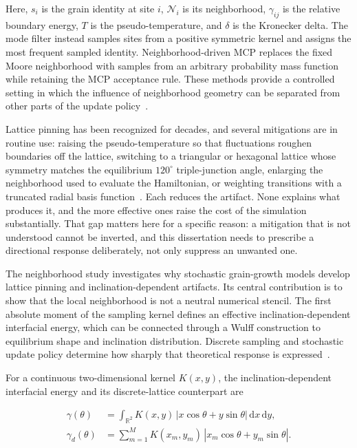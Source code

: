 \documentclass[proposalMode]{ufdissertation}
\begin{document}
Here, \(s_i\) is the grain identity at site \(i\), \(\mathcal{N}_i\) is its neighborhood, \(\gamma_{ij}\) is the relative boundary energy, \(T\) is the pseudo-temperature, and \(\delta\) is the Kronecker delta. The mode filter instead samples sites from a positive symmetric kernel and assigns the most frequent sampled identity. Neighborhood-driven MCP replaces the fixed Moore neighborhood with samples from an arbitrary probability mass function while retaining the MCP acceptance rule. These methods provide a controlled setting in which the influence of neighborhood geometry can be separated from other parts of the update policy~\cite{wu1982potts,anderson1984kinetics,melville2024modefilter,tian2026neighborhood}.

Lattice pinning has been recognized for decades, and several mitigations are in routine use: raising the pseudo-temperature so that fluctuations roughen boundaries off the lattice, switching to a triangular or hexagonal lattice whose symmetry matches the equilibrium \(120^\circ\) triple-junction angle, enlarging the neighborhood used to evaluate the Hamiltonian, or weighting transitions with a truncated radial basis function~\cite{holm1998mobility,zollner2014temperature,mason2015kinetics}. Each reduces the artifact. None explains what produces it, and the more effective ones raise the cost of the simulation substantially. That gap matters here for a specific reason: a mitigation that is not understood cannot be inverted, and this dissertation needs to prescribe a directional response deliberately, not only suppress an unwanted one.

The neighborhood study investigates why stochastic grain-growth models develop lattice pinning and inclination-dependent artifacts. Its central contribution is to show that the local neighborhood is not a neutral numerical stencil. The first absolute moment of the sampling kernel defines an effective inclination-dependent interfacial energy, which can be connected through a Wulff construction to equilibrium shape and inclination distribution. Discrete sampling and stochastic update policy determine how sharply that theoretical response is expressed~\cite{tian2026neighborhood}.

For a continuous two-dimensional kernel \(K(x,y)\), the inclination-dependent interfacial energy and its discrete-lattice counterpart are

\begin{equation}
\begin{aligned}
\gamma(\theta)
&=
\int_{\mathbb{R}^2}
K(x,y)\,
\left|x\cos\theta+y\sin\theta\right|
\,\mathrm{d}x\,\mathrm{d}y,\\
\gamma_d(\theta)
&=
\sum_{m=1}^{M}
K(x_m,y_m)\,
\left|x_m\cos\theta+y_m\sin\theta\right|.
\end{aligned}
\label{eq:kernel-energy}
\end{equation}
\end{document}

